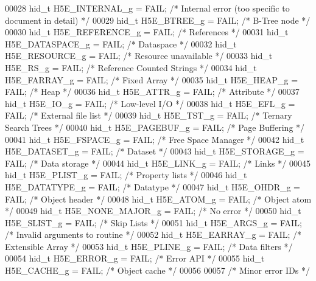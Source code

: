 \begin{DoxyCode}
00028 hid\_t H5E\_INTERNAL\_g       = FAIL;      \textcolor{comment}{/* Internal error (too specific to document in detail) */}
00029 hid\_t H5E\_BTREE\_g          = FAIL;      \textcolor{comment}{/* B-Tree node */}
00030 hid\_t H5E\_REFERENCE\_g      = FAIL;      \textcolor{comment}{/* References */}
00031 hid\_t H5E\_DATASPACE\_g      = FAIL;      \textcolor{comment}{/* Dataspace */}
00032 hid\_t H5E\_RESOURCE\_g       = FAIL;      \textcolor{comment}{/* Resource unavailable */}
00033 hid\_t H5E\_RS\_g             = FAIL;      \textcolor{comment}{/* Reference Counted Strings */}
00034 hid\_t H5E\_FARRAY\_g         = FAIL;      \textcolor{comment}{/* Fixed Array */}
00035 hid\_t H5E\_HEAP\_g           = FAIL;      \textcolor{comment}{/* Heap */}
00036 hid\_t H5E\_ATTR\_g           = FAIL;      \textcolor{comment}{/* Attribute */}
00037 hid\_t H5E\_IO\_g             = FAIL;      \textcolor{comment}{/* Low-level I/O */}
00038 hid\_t H5E\_EFL\_g            = FAIL;      \textcolor{comment}{/* External file list */}
00039 hid\_t H5E\_TST\_g            = FAIL;      \textcolor{comment}{/* Ternary Search Trees */}
00040 hid\_t H5E\_PAGEBUF\_g        = FAIL;      \textcolor{comment}{/* Page Buffering */}
00041 hid\_t H5E\_FSPACE\_g         = FAIL;      \textcolor{comment}{/* Free Space Manager */}
00042 hid\_t H5E\_DATASET\_g        = FAIL;      \textcolor{comment}{/* Dataset */}
00043 hid\_t H5E\_STORAGE\_g        = FAIL;      \textcolor{comment}{/* Data storage */}
00044 hid\_t H5E\_LINK\_g           = FAIL;      \textcolor{comment}{/* Links */}
00045 hid\_t H5E\_PLIST\_g          = FAIL;      \textcolor{comment}{/* Property lists */}
00046 hid\_t H5E\_DATATYPE\_g       = FAIL;      \textcolor{comment}{/* Datatype */}
00047 hid\_t H5E\_OHDR\_g           = FAIL;      \textcolor{comment}{/* Object header */}
00048 hid\_t H5E\_ATOM\_g           = FAIL;      \textcolor{comment}{/* Object atom */}
00049 hid\_t H5E\_NONE\_MAJOR\_g     = FAIL;      \textcolor{comment}{/* No error */}
00050 hid\_t H5E\_SLIST\_g          = FAIL;      \textcolor{comment}{/* Skip Lists */}
00051 hid\_t H5E\_ARGS\_g           = FAIL;      \textcolor{comment}{/* Invalid arguments to routine */}
00052 hid\_t H5E\_EARRAY\_g         = FAIL;      \textcolor{comment}{/* Extensible Array */}
00053 hid\_t H5E\_PLINE\_g          = FAIL;      \textcolor{comment}{/* Data filters */}
00054 hid\_t H5E\_ERROR\_g          = FAIL;      \textcolor{comment}{/* Error API */}
00055 hid\_t H5E\_CACHE\_g          = FAIL;      \textcolor{comment}{/* Object cache */}
00056 
00057 \textcolor{comment}{/* Minor error IDs */}

\end{DoxyCode}
